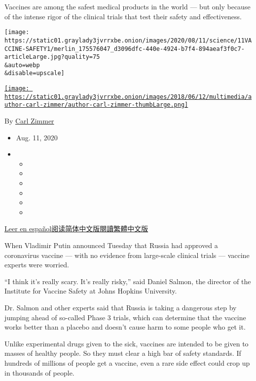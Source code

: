 Vaccines are among the safest medical products in the world --- but only
because of the intense rigor of the clinical trials that test their
safety and effectiveness.

\texttt{[image: https://static01.graylady3jvrrxbe.onion/images/2020/08/11/science/11VACCINE-SAFETY1/merlin\_175576047\_d3096dfc-440e-4924-b7f4-894aeaf3f0c7-articleLarge.jpg?quality=75\\\&auto=webp\\\&disable=upscale]}

\href{https://www.nytimes3xbfgragh.onion/by/carl-zimmer}{\texttt{[image: https://static01.graylady3jvrrxbe.onion/images/2018/06/12/multimedia/author-carl-zimmer/author-carl-zimmer-thumbLarge.png]}}

By \href{https://www.nytimes3xbfgragh.onion/by/carl-zimmer}{Carl Zimmer}

\begin{itemize}
\item
  Aug. 11, 2020
\item
  \begin{itemize}
  \item
  \item
  \item
  \item
  \item
  \item
  \end{itemize}
\end{itemize}

\href{https://www.nytimes3xbfgragh.onion/es/2020/08/12/espanol/ciencia-y-tecnologia/vacuna-rusia-coronavirus.html}{Leer
en
español}\href{https://cn.nytimes3xbfgragh.onion/world/20200813/russia-covid-19-vaccine-safety/}{阅读简体中文版}\href{https://cn.nytimes3xbfgragh.onion/world/20200813/russia-covid-19-vaccine-safety/zh-hant/}{閱讀繁體中文版}

When Vladimir Putin announced Tuesday that Russia had approved a
coronavirus vaccine --- with no evidence from large-scale clinical
trials --- vaccine experts were worried.

``I think it's really scary. It's really risky,'' said Daniel Salmon,
the director of the Institute for Vaccine Safety at Johns Hopkins
University.

Dr. Salmon and other experts said that Russia is taking a dangerous step
by jumping ahead of so-called Phase 3 trials, which can determine that
the vaccine works better than a placebo and doesn't cause harm to some
people who get it.

Unlike experimental drugs given to the sick, vaccines are intended to be
given to masses of healthy people. So they must clear a high bar of
safety standards. If hundreds of millions of people get a vaccine, even
a rare side effect could crop up in thousands of people.

